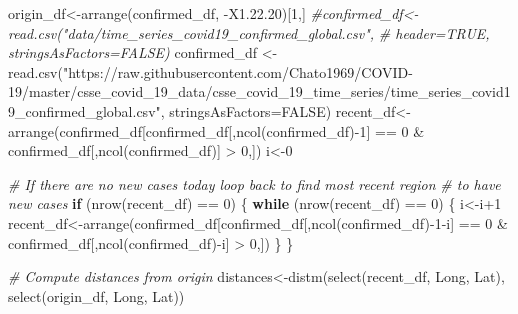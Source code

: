 \documentclass[
]{article}
\newenvironment{Shaded}{\begin{snugshade}}{\end{snugshade}}
\newcommand{\AttributeTok}[1]{\textcolor[rgb]{0.77,0.63,0.00}{#1}}
\newcommand{\CommentTok}[1]{\textcolor[rgb]{0.56,0.35,0.01}{\textit{#1}}}
\newcommand{\ConstantTok}[1]{\textcolor[rgb]{0.00,0.00,0.00}{#1}}
\newcommand{\ControlFlowTok}[1]{\textcolor[rgb]{0.13,0.29,0.53}{\textbf{#1}}}
\newcommand{\DecValTok}[1]{\textcolor[rgb]{0.00,0.00,0.81}{#1}}
\newcommand{\FloatTok}[1]{\textcolor[rgb]{0.00,0.00,0.81}{#1}}
\newcommand{\FunctionTok}[1]{\textcolor[rgb]{0.00,0.00,0.00}{#1}}
\newcommand{\NormalTok}[1]{#1}
\newcommand{\OtherTok}[1]{\textcolor[rgb]{0.56,0.35,0.01}{#1}}
\newcommand{\SpecialCharTok}[1]{\textcolor[rgb]{0.00,0.00,0.00}{#1}}
\newcommand{\StringTok}[1]{\textcolor[rgb]{0.31,0.60,0.02}{#1}}
\begin{document}
\begin{Shaded}
\begin{Highlighting}[]
\NormalTok{origin\_df}\OtherTok{\textless{}{-}}\FunctionTok{arrange}\NormalTok{(confirmed\_df, }\SpecialCharTok{{-}}\NormalTok{X1.}\FloatTok{22.20}\NormalTok{)[}\DecValTok{1}\NormalTok{,]}
\CommentTok{\#confirmed\_df\textless{}{-}read.csv("data/time\_series\_covid19\_confirmed\_global.csv", }
\CommentTok{\#                       header=TRUE, stringsAsFactors=FALSE)}
\NormalTok{confirmed\_df }\OtherTok{\textless{}{-}} \FunctionTok{read.csv}\NormalTok{(}\StringTok{"https://raw.githubusercontent.com/Chato1969/COVID{-}19/master/csse\_covid\_19\_data/csse\_covid\_19\_time\_series/time\_series\_covid19\_confirmed\_global.csv"}\NormalTok{, }\AttributeTok{stringsAsFactors=}\ConstantTok{FALSE}\NormalTok{)}
\NormalTok{recent\_df}\OtherTok{\textless{}{-}}\FunctionTok{arrange}\NormalTok{(confirmed\_df[confirmed\_df[,}\FunctionTok{ncol}\NormalTok{(confirmed\_df)}\SpecialCharTok{{-}}\DecValTok{1}\NormalTok{] }\SpecialCharTok{==} \DecValTok{0} 
                                \SpecialCharTok{\&}\NormalTok{ confirmed\_df[,}\FunctionTok{ncol}\NormalTok{(confirmed\_df)] }\SpecialCharTok{\textgreater{}} \DecValTok{0}\NormalTok{,])}
\NormalTok{i}\OtherTok{\textless{}{-}}\DecValTok{0}

\CommentTok{\# If there are no new cases today loop back to find most recent region}
\CommentTok{\# to have new cases}
\ControlFlowTok{if}\NormalTok{ (}\FunctionTok{nrow}\NormalTok{(recent\_df) }\SpecialCharTok{==} \DecValTok{0}\NormalTok{) \{}
  \ControlFlowTok{while}\NormalTok{ (}\FunctionTok{nrow}\NormalTok{(recent\_df) }\SpecialCharTok{==} \DecValTok{0}\NormalTok{) \{}
\NormalTok{    i}\OtherTok{\textless{}{-}}\NormalTok{i}\SpecialCharTok{+}\DecValTok{1}
\NormalTok{    recent\_df}\OtherTok{\textless{}{-}}\FunctionTok{arrange}\NormalTok{(confirmed\_df[confirmed\_df[,}\FunctionTok{ncol}\NormalTok{(confirmed\_df)}\SpecialCharTok{{-}}\DecValTok{1}\SpecialCharTok{{-}}\NormalTok{i] }\SpecialCharTok{==} \DecValTok{0} 
                                \SpecialCharTok{\&}\NormalTok{ confirmed\_df[,}\FunctionTok{ncol}\NormalTok{(confirmed\_df)}\SpecialCharTok{{-}}\NormalTok{i] }\SpecialCharTok{\textgreater{}} \DecValTok{0}\NormalTok{,])}
\NormalTok{  \}}
\NormalTok{\}}

\CommentTok{\# Compute distances from origin}
\NormalTok{distances}\OtherTok{\textless{}{-}}\FunctionTok{distm}\NormalTok{(}\FunctionTok{select}\NormalTok{(recent\_df, Long, Lat), }\FunctionTok{select}\NormalTok{(origin\_df, Long, Lat))}


\end{Highlighting}
\end{Shaded}
\end{document}
